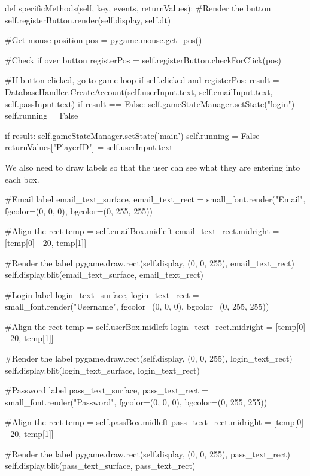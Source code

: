 \begin{mpy}
    def specificMethods(self, key, events, returnValues):
        #Render the button
        self.registerButton.render(self.display, self.dt)

        #Get mouse position
        pos = pygame.mouse.get_pos()

        #Check if over button
        registerPos = self.registerButton.checkForClick(pos)

        #If button clicked, go to game loop
        if self.clicked and registerPos:
            result = DatabaseHandler.CreateAccount(self.userInput.text, self.emailInput.text, self.passInput.text)
            if result == False:
                self.gameStateManager.setState("login")
                self.running = False

            if result:
                self.gameStateManager.setState('main')
                self.running = False
                returnValues["PlayerID"] = self.userInput.text
\end{mpy}

We also need to draw labels so that the user can see what they are entering into each box.

\begin{mpy}
        #Email label
        email_text_surface, email_text_rect = small_font.render("Email", fgcolor=(0, 0, 0), bgcolor=(0, 255, 255))

        #Align the rect
        temp = self.emailBox.midleft
        email_text_rect.midright = [temp[0] - 20, temp[1]]

        #Render the label
        pygame.draw.rect(self.display, (0, 0, 255), email_text_rect)
        self.display.blit(email_text_surface, email_text_rect)

        #Login label
        login_text_surface, login_text_rect = small_font.render("Username", fgcolor=(0, 0, 0), bgcolor=(0, 255, 255))

        #Align the rect
        temp = self.userBox.midleft
        login_text_rect.midright = [temp[0] - 20, temp[1]]

        #Render the label
        pygame.draw.rect(self.display, (0, 0, 255), login_text_rect)
        self.display.blit(login_text_surface, login_text_rect)

        #Password label
        pass_text_surface, pass_text_rect = small_font.render("Password", fgcolor=(0, 0, 0), bgcolor=(0, 255, 255))

        #Align the rect
        temp = self.passBox.midleft
        pass_text_rect.midright = [temp[0] - 20, temp[1]]

        #Render the label
        pygame.draw.rect(self.display, (0, 0, 255), pass_text_rect)
        self.display.blit(pass_text_surface, pass_text_rect)
\end{mpy}

